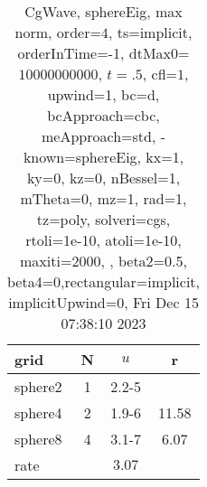 \begin{table}[H]\tableFont %
\begin{center}
\begin{tabular}{|l|c|c|c|} \hline 
grid  & N &  $ u $ & r \\ \hline 
   sphere2 &     1 & \num{2.2}{-5} &        \\ \hline
   sphere4 &     2 & \num{1.9}{-6} & 11.58  \\ \hline
   sphere8 &     4 & \num{3.1}{-7} &  6.07  \\ \hline
    rate             &       &  $3.07$       &       \\ \hline
\end{tabular}
\caption{CgWave, sphereEig, max norm, order=$4$, ts=implicit, orderInTime=-1, dtMax0=$10000000000$, $t=.5$, cfl=$1$, upwind=1, bc=d, bcApproach=cbc, meApproach=std, -known=sphereEig, kx=1, ky=0, kz=0, nBessel=1, mTheta=0, mz=1, rad=1, tz=poly, solveri=cgs, rtoli=1e-10, atoli=1e-10, maxiti=2000, , beta2=0.5, beta4=0,rectangular=implicit, implicitUpwind=0, Fri Dec 15 07:38:10 2023}\label{table:sphereEigOrder4max}
\end{center}
\end{table}
